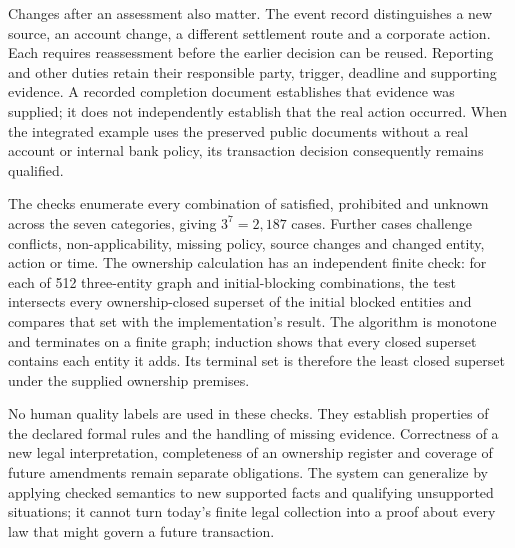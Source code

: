 Changes after an assessment also matter. The event record distinguishes a new
source, an account change, a different settlement route and a corporate action.
Each requires reassessment before the earlier decision can be reused. Reporting
and other duties retain their responsible party, trigger, deadline and supporting
evidence. A recorded completion document establishes that evidence was supplied;
it does not independently establish that the real action occurred. When the
integrated example uses the preserved public documents without a real account
or internal bank policy, its transaction decision consequently remains qualified.

The checks enumerate every combination of satisfied, prohibited and unknown
across the seven categories, giving $3^7=2{,}187$ cases. Further cases challenge
conflicts, non-applicability, missing policy, source changes and changed entity,
action or time. The ownership calculation has an independent finite check: for
each of 512 three-entity graph and initial-blocking combinations, the test
intersects every ownership-closed superset of the initial blocked entities and
compares that set with the implementation's result. The algorithm is monotone
and terminates on a finite graph; induction shows that every closed superset
contains each entity it adds. Its terminal set is therefore the least closed
superset under the supplied ownership premises.

No human quality labels are used in these checks. They establish properties of
the declared formal rules and the handling of missing evidence. Correctness of
a new legal interpretation, completeness of an ownership register and coverage
of future amendments remain separate obligations. The system can generalize by
applying checked semantics to new supported facts and qualifying unsupported
situations; it cannot turn today's finite legal collection into a proof about
every law that might govern a future transaction.
